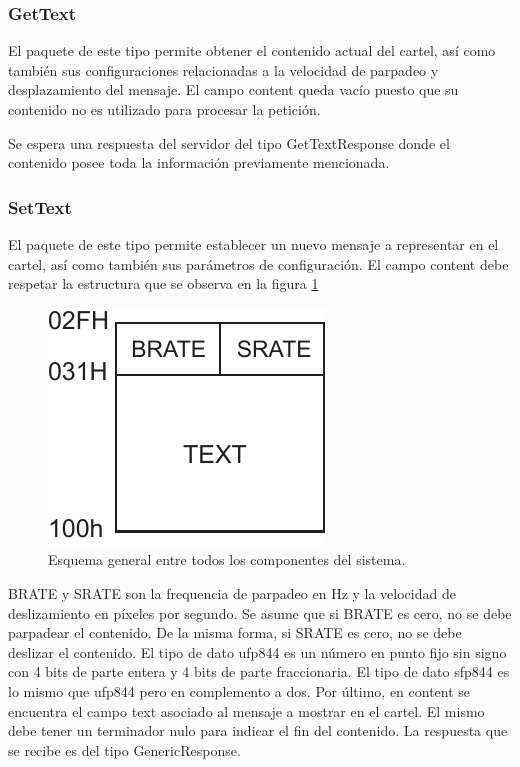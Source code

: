 \subsubsection{GetText}

El paquete de este tipo permite obtener el contenido actual del cartel, así como también sus configuraciones relacionadas a la velocidad de parpadeo y desplazamiento del mensaje.
El campo content queda vacío puesto que su contenido no es utilizado para procesar la petición.

Se espera una respuesta del servidor del tipo GetTextResponse donde el contenido posee toda la información previamente mencionada.



\subsubsection{SetText}

El paquete de este tipo permite establecer un nuevo mensaje a representar en el cartel, así como también sus parámetros de configuración.
El campo content debe respetar la estructura que se observa en la figura \ref{fig:paquete-anim}


\begin{figure}[!ht]
	\centering
	\includegraphics[width=0.3\linewidth]{imagenes/protocolo/paquete-anim.pdf}
	\caption{Esquema general entre todos los componentes del sistema.}
	\label{fig:paquete-anim}
\end{figure}

BRATE y SRATE son la frequencia de parpadeo en Hz y la velocidad de deslizamiento en píxeles por segundo.
Se asume que si BRATE es cero, no se debe parpadear el contenido.
De la misma forma, si SRATE es cero, no se debe deslizar el contenido.
El tipo de dato ufp844 es un número en punto fijo sin signo con 4 bits de parte entera y 4 bits de parte fraccionaria.
El tipo de dato sfp844 es lo mismo que ufp844 pero en complemento a dos.
Por último, en content se encuentra el campo text asociado al mensaje a mostrar en el cartel.
El mismo debe tener un terminador nulo para indicar el fin del contenido.
La respuesta que se recibe es del tipo GenericResponse.



